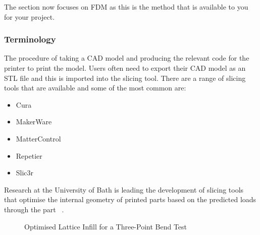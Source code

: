 The section now focuses on \ac{FDM} as this is the method that is available to you for your project.

\subsubsection{Terminology}

The procedure of taking a \acf{CAD} model and producing the relevant code for the printer to print the model. Users often need to export their \ac{CAD} model as an \acf{STL} file and this is imported into the slicing tool. There are a range of slicing tools that are available and some of the most common are:

\begin{itemize}
    \item Cura
    \item MakerWare
    \item MatterControl
    \item Repetier
    \item Slic3r
\end{itemize}

Research at the University of Bath is leading the development of slicing tools that optimise the internal geometry of printed parts based on the predicted loads through the part ~\cite[-3em]{pam2017}.

\begin{figure}
    
    \hfill
    \hfill
    \hfill
    
    \vspace{1em}
    \caption{Optimised Lattice Infill for a Three-Point Bend Test}
    \label{fig-3d-print-bath}
\end{figure}



